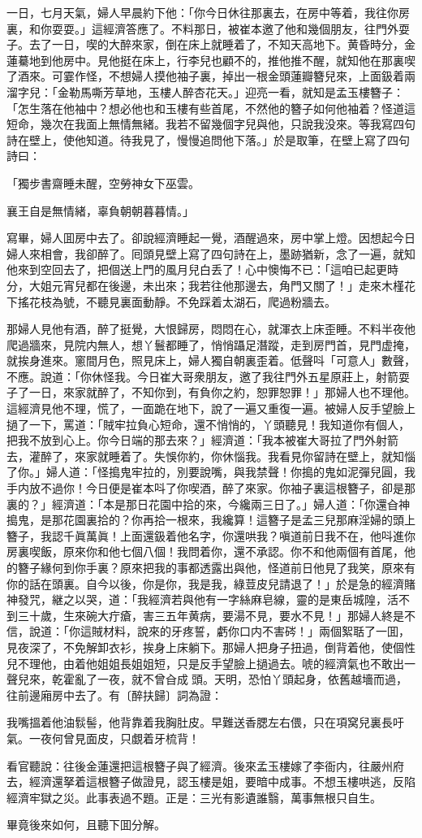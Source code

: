 一日，七月天氣，婦人早晨約下他：「你今日休往那裏去，在房中等着，我往你房裏，和你耍耍。」這經濟答應了。不料那日，被崔本邀了他和幾個朋友，往門外耍子。去了一日，喫的大醉來家，倒在床上就睡着了，不知天高地下。黄昏時分，金蓮驀地到他房中。見他挺在床上，行李兒也顧不的，推他推不醒，就知他在那裏喫了酒來。可霎作怪，不想婦人摸他袖子裏，掉出一根金頭蓮瓣簪兒來，上面鈒着兩溜字兒：「金勒馬嘶芳草地，玉樓人醉杏花天。」迎亮一看，就知是孟玉樓簪子：「怎生落在他袖中？想必他也和玉樓有些首尾，不然他的簪子如何他袖着？怪道這短命，幾次在我面上無情無緒。我若不留幾個字兒與他，只說我没來。等我寫四句詩在壁上，使他知道。待我見了，慢慢追問他下落。」於是取筆，在壁上寫了四句詩曰：

\begin{myquote}
「獨步書齋睡未醒，空勞神女下巫雲。

襄王自是無情緒，辜負朝朝暮暮情。」
\end{myquote}

寫畢，婦人囬房中去了。卻說經濟睡起一覺，酒醒過來，房中掌上燈。因想起今日婦人來相會，我卻醉了。囘頭見壁上寫了四句詩在上，墨跡猶新，念了一遍，就知他來到空回去了，把個送上門的風月兒白丢了！心中懊悔不已：「這咱已起更時分，大姐元宵兒都在後邊，未出來；我若往他那邊去，角門又關了！」走來木槿花下搖花枝為號，不聽見裏面動靜。不免踩着太湖石，爬過粉牆去。

那婦人見他有酒，醉了挺覺，大恨歸房，悶悶在心，就渾衣上床歪睡。不料半夜他爬過牆來，見院内無人，想丫鬟都睡了，悄悄躡足潛蹤，走到房門首，見門虚掩，就挨身進來。窻間月色，照見床上，婦人獨自朝裏歪着。低聲呌「可意人」數聲，不應。說道：「你休怪我。今日崔大哥衆朋友，邀了我往門外五星原莊上，射箭耍子了一日，來家就醉了，不知你到，有負你之約，恕罪恕罪！」那婦人也不理他。這經濟見他不理，慌了，一面跪在地下，說了一遍又重復一遍。被婦人反手望臉上撾了一下，罵道：「賊牢拉負心短命，還不悄悄的，丫頭聽見！我知道你有個人，把我不放到心上。你今日端的那去來？」經濟道：「我本被崔大哥拉了門外射箭去，灌醉了，來家就睡着了。失悞你約，你休惱我。我看見你留詩在壁上，就知惱了你。」婦人道：「怪搗鬼牢拉的，別要說嘴，與我禁聲！你搗的鬼如泥彈兒圓，我手内放不過你！今日便是崔本呌了你喫酒，醉了來家。你袖子裏這根簪子，卻是那裏的？」經濟道：「本是那日花園中拾的來，今纔兩三日了。」婦人道：「你還㒲神搗鬼，是那花園裏拾的？你再拾一根來，我纔算！這簪子是孟三兒那麻淫婦的頭上簪子，我認千眞萬眞！上面還鈒着他名字，你還哄我？嗔道前日我不在，他呌進你房裏喫飯，原來你和他七個八個！我問着你，還不承認。你不和他兩個有首尾，他的簪子緣何到你手裏？原來把我的事都透露出與他，怪道前日他見了我笑，原來有你的話在頭裏。自今以後，你是你，我是我，綠荳皮兒請退了！」於是急的經濟賭神發咒，継之以哭，道：「我經濟若與他有一字絲麻皂線，靈的是東岳城隍，活不到三十歲，生來碗大疔瘡，害三五年黄病，要湯不見，要水不見！」那婦人終是不信，說道：「你這賊材料，說來的牙疼誓，虧你口内不害硶！」兩個絮聒了一囬，見夜深了，不免解卸衣衫，挨身上床躺下。那婦人把身子扭過，倒背着他，使個性兒不理他，由着他姐姐長姐姐短，只是反手望臉上撾過去。唬的經濟氣也不敢出一聲兒來，乾霍亂了一夜，就不曾㒲成𣭈頭。天明，恐怕丫頭起身，依舊越墻而過，往前邊廂房中去了。有〔醉扶歸〕詞為證：

\begin{myquote}
我嘴搵着他油䯼髻，他背靠着我胸肚皮。早難送香腮左右偎，只在項窝兒裏長吁氣。一夜何曾見面皮，只覷着牙梳背！
\end{myquote}

看官聽說：往後金蓮還把這根簪子與了經濟。後來孟玉樓嫁了李衙内，往嚴州府去，經濟還拏着這根簪子做證見，認玉樓是姐，要暗中成事。不想玉樓哄逃，反陷經濟牢獄之災。此事表過不題。正是：三光有影遺誰翳，萬事無根只自生。

畢竟後來如何，且聽下囬分解。

